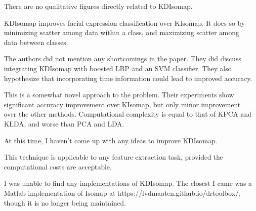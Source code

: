 \documentclass[11pt]{article}
\begin{document}
\begin{description}[leftmargin=0in]
        There are no qualitative figures directly related to KDIsomap.

    \item [Contributions] KDIsomap improves facial expression classification
        over KIsomap. It does so by minimizing scatter among data within a
        class, and maximizing scatter among data between classes.

    \item [Shortcomings] The authors did not mention any shortcomings in the
        paper. They did discuss integrating KDIsomap with boosted LBP and an SVM
        classifier. They also hypothesize that incorporating time information
        could lead to improved accuracy.

    \item [Self Evaluation] This is a somewhat novel approach to the problem.
        Their experiments show significant accuracy improvement over KIsomap,
        but only minor improvement over the other methods. Computational
        complexity is equal to that of KPCA and KLDA, and worse than PCA and
        LDA.

    \item [Improvements] At this time, I haven't come up with any ideas to
        improve KDIsomap.

    \item [Applications] This technique is applicable to any feature extraction
        task, provided the computational costs are acceptable.

    \item [Packages] I was unable to find any implementations of KDIsomap. The
        closest I came was a Matlab implementation of Isomap at
        https://lvdmaaten.github.io/drtoolbox/, though it is no longer being
        maintained.
\end{description}



\end{document}
